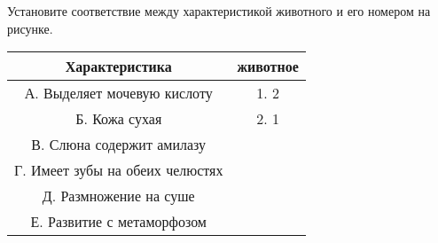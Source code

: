 Установите соответствие между характеристикой животного и его номером на рисунке. \\

\begin{tabular}{|c|c|}
    \hline
    Характеристика & животное \\
    \hline
    А. Выделяет мочевую кислоту & 1. 2\\
    Б. Кожа сухая & 2. 1\\
    В. Слюна содержит амилазу & \\
    Г. Имеет зубы на обеих челюстях & \\
    Д. Размножение на суше & \\
    Е. Развитие с метаморфозом & \\
    \hline
\end{tabular}